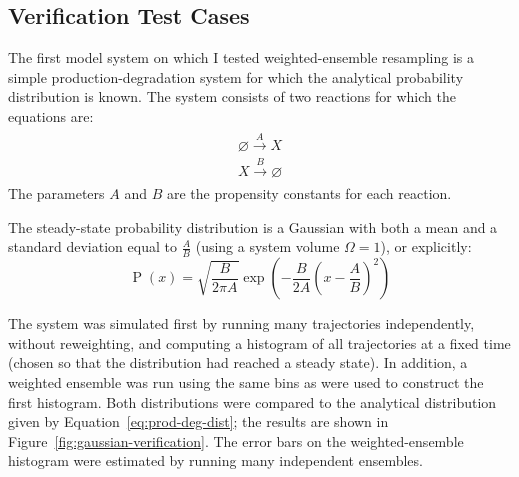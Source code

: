 \documentclass[english,letterpaper,12pt]{article}
\DeclareMathOperator{\Prob}{P}
\begin{document}
\begin{doublespacing}


\subsection{Verification Test Cases} %
\label{sub:verification}

The first model system on which I tested weighted-ensemble resampling is a simple production-degradation system for which the analytical probability distribution is known. The system consists of two reactions for which the equations are:
\begin{align}
    \begin{gathered}
        \varnothing \xrightarrow{A} X \\
        X \xrightarrow {B} \varnothing
    \end{gathered}
    \label{eq:prod-deg-rxn}
\end{align}
The parameters $A$ and $B$ are the propensity constants for each reaction.

The steady-state probability distribution is a Gaussian with both a mean and a standard deviation equal to $\frac{A}{B}$ (using a system volume $\Omega = 1$), or explicitly:
\begin{equation}
    \Prob(x) = \sqrt{\frac{B}{2\pi A}}\exp\left( -\frac{B}{2 A} \left( x - \frac{A}{B} \right)^2  \right)
    \label{eq:prod-deg-dist}
\end{equation}

The system was simulated first by running many trajectories independently, without reweighting, and computing a histogram of all trajectories at a fixed time (chosen so that the distribution had reached a steady state). In addition, a weighted ensemble was run using the same bins as were used to construct the first histogram. Both distributions were compared to the analytical distribution given by Equation~\eqref{eq:prod-deg-dist}; the results are shown in Figure~\ref{fig:gaussian-verification}. The error bars on the weighted-ensemble histogram were estimated by running many independent ensembles. 

\begin{figure}[hp]
    \begin{center}
        \begin{subfigure}{\textwidth}
                
            \label{sfg:gaussvf-comparison}
        \end{subfigure}


\end{center}
\end{figure}
\end{doublespacing}
\end{document}
